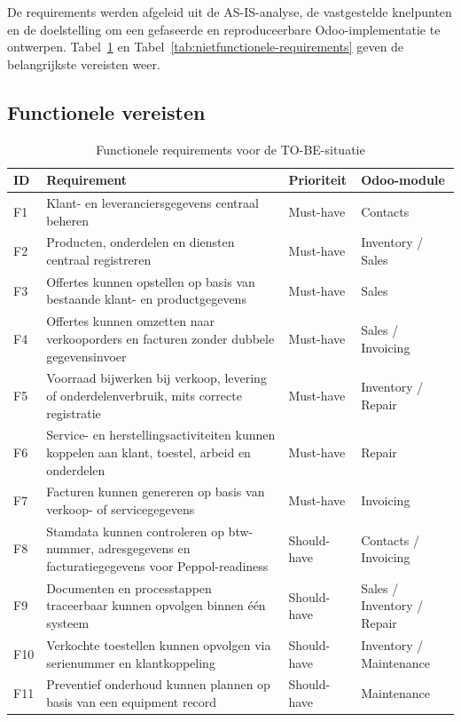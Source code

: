 De requirements werden afgeleid uit de AS-IS-analyse, de vastgestelde knelpunten en de doelstelling om een gefaseerde en reproduceerbare Odoo-implementatie te ontwerpen. Tabel~\ref{tab:functionele-requirements} en Tabel~\ref{tab:nietfunctionele-requirements} geven de belangrijkste vereisten weer.

\subsection{Functionele vereisten}

\begin{table}[H]
\centering
\caption{Functionele requirements voor de TO-BE-situatie}
\label{tab:functionele-requirements}
\begin{tabular}{|p{1.2cm}|p{6.2cm}|p{2.2cm}|p{3.2cm}|}
\hline
\textbf{ID} & \textbf{Requirement} & \textbf{Prioriteit} & \textbf{Odoo-module} \\
\hline
F1 & Klant- en leveranciersgegevens centraal beheren & Must-have & Contacts \\
\hline
F2 & Producten, onderdelen en diensten centraal registreren & Must-have & Inventory / Sales \\
\hline
F3 & Offertes kunnen opstellen op basis van bestaande klant- en productgegevens & Must-have & Sales \\
\hline
F4 & Offertes kunnen omzetten naar verkooporders en facturen zonder dubbele gegevensinvoer & Must-have & Sales / Invoicing \\
\hline
F5 & Voorraad bijwerken bij verkoop, levering of onderdelenverbruik, mits correcte registratie & Must-have & Inventory / Repair \\
\hline
F6 & Service- en herstellingsactiviteiten kunnen koppelen aan klant, toestel, arbeid en onderdelen & Must-have & Repair \\
\hline
F7 & Facturen kunnen genereren op basis van verkoop- of servicegegevens & Must-have & Invoicing \\
\hline
F8 & Stamdata kunnen controleren op btw-nummer, adresgegevens en facturatiegegevens voor Peppol-readiness & Should-have & Contacts / Invoicing \\
\hline
F9 & Documenten en processtappen traceerbaar kunnen opvolgen binnen één systeem & Should-have & Sales / Inventory / Repair \\
\hline
F10 & Verkochte toestellen kunnen opvolgen via serienummer en klantkoppeling & Should-have & Inventory / Maintenance \\
\hline
F11 & Preventief onderhoud kunnen plannen op basis van een equipment record & Should-have & Maintenance \\
\hline
\end{tabular}
\end{table}

